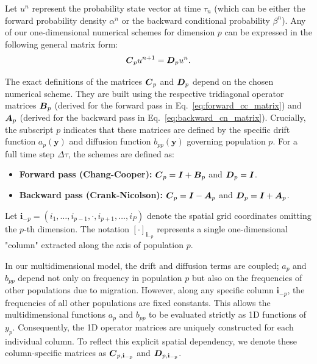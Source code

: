 \documentclass{article}
\def\A{\mbox{\boldmath $A$}}
\def\B{\mbox{\boldmath $B$}}
\def\C{\mbox{\boldmath $C$}}
\def\D{\mbox{\boldmath $D$}}
\def\I{\mbox{\boldmath $I$}}
\begin{document}
\bigskip

Let $u^n$ represent the probability state vector at time $\tau_n$ (which can be either the forward probability density $\alpha^n$ or the backward conditional probability $\beta^n$). Any of our one-dimensional numerical schemes for dimension $p$ can be expressed in the following general matrix form:
\begin{equation*}
    \C_p u^{n+1} = \D_p u^{n}.
\end{equation*}

The exact definitions of the matrices $\C_p$ and $\D_p$ depend on the chosen numerical scheme.
They are built using the respective tridiagonal operator matrices $\B_p$ (derived for the forward pass in Eq.~\ref{eq:forward_cc_matrix}) and $\A_p$ (derived for the backward pass in Eq.~\ref{eq:backward_cn_matrix}). 
Crucially, the subscript $p$ indicates that these matrices are defined by the specific drift function $a_p(\mathbf{y})$ and diffusion function $b_{pp}(\mathbf{y})$ governing population $p$.
For a full time step $\Delta \tau$, the schemes are defined as:
\begin{itemize}
    \item \textbf{Forward pass (Chang-Cooper):} $\C_p = \I + \B_p$ and $\D_p = \I$.
    \item \textbf{Backward pass (Crank-Nicolson):} $\C_p = \I - \A_p$ and $\D_p = \I + \A_p$.
\end{itemize}

\bigskip

Let $\mathbf{i}_{-p} = (i_1, \dots, i_{p-1}, \cdot, i_{p+1}, \dots, i_P)$ denote the spatial grid coordinates omitting the $p$-th dimension. The notation $[\cdot]_{\mathbf{i}_{-p}}$ represents a single one-dimensional "column" extracted along the axis of population $p$. 

In our multidimensional model, the drift and diffusion terms are coupled; $a_p$ and $b_{pp}$ depend not only on frequency in population $p$ but also on the frequencies of other populations due to migration.
However, along any specific column $\mathbf{i}_{-p}$, the frequencies of all other populations are fixed constants.
This allows the multidimensional functions $a_p$ and $b_{pp}$ to be evaluated strictly as 1D functions of $y_p$.
Consequently, the 1D operator matrices are uniquely constructed for each individual column.
To reflect this explicit spatial dependency, we denote these column-specific matrices as $\C_{p, \mathbf{i}_{-p}}$ and $\D_{p, \mathbf{i}_{-p}}$.
\end{document}
